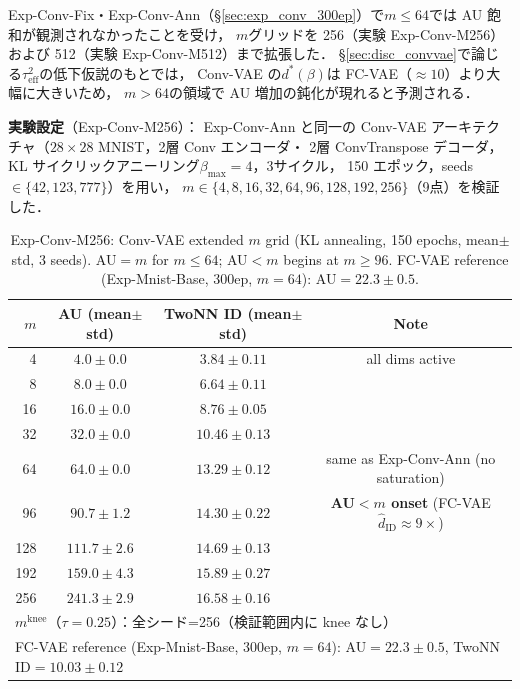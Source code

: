 \documentclass[11pt,a4paper]{jsarticle}
\newcommand{\mknee}{m^{\mathrm{knee}}}
\begin{document}
Exp-Conv-Fix・Exp-Conv-Ann（§\ref{sec:exp_conv_300ep}）で$m \leq 64$では AU 飽和が観測されなかったことを受け，
$m$グリッドを 256（実験 Exp-Conv-M256）および 512（実験 Exp-Conv-M512）まで拡張した．
§\ref{sec:disc_convvae}で論じる$\tau^2_\mathrm{eff}$の低下仮説のもとでは，
Conv-VAE の$d^*(\beta)$は FC-VAE（$\approx 10$）より大幅に大きいため，
$m>64$の領域で AU 増加の鈍化が現れると予測される．

\textbf{実験設定}（Exp-Conv-M256）：
Exp-Conv-Ann と同一の Conv-VAE アーキテクチャ（$28\times28$ MNIST，2層 Conv エンコーダ・
2層 ConvTranspose デコーダ，KL サイクリックアニーリング$\beta_\mathrm{max}=4$，3サイクル，
150 エポック，seeds$\in\{42,123,777\}$）を用い，
$m \in \{4, 8, 16, 32, 64, 96, 128, 192, 256\}$（9点）を検証した．

\begin{table}[H]
\centering
\caption{Exp-Conv-M256: Conv-VAE extended $m$ grid (KL annealing, 150 epochs, mean$\pm$std, 3 seeds). AU$=m$ for $m \leq 64$; AU$<m$ begins at $m \geq 96$. FC-VAE reference (Exp-Mnist-Base, 300ep, $m=64$): AU$=22.3\pm0.5$.}
\label{tab:en}
\small
\begin{tabular}{rccc}
\toprule
$m$ & AU (mean$\pm$std) & TwoNN ID (mean$\pm$std) & Note \\
\midrule
  4 & $4.0\pm0.0$   & $3.84\pm0.11$ & all dims active \\
  8 & $8.0\pm0.0$   & $6.64\pm0.11$ & \\
 16 & $16.0\pm0.0$  & $8.76\pm0.05$ & \\
 32 & $32.0\pm0.0$  & $10.46\pm0.13$ & \\
 64 & $64.0\pm0.0$  & $13.29\pm0.12$ & same as Exp-Conv-Ann (no saturation) \\
 96 & $\mathbf{90.7\pm1.2}$  & $14.30\pm0.22$ & \textbf{AU$<m$ onset} (FC-VAE $\hat{d}_\mathrm{ID} \approx 9\times$) \\
128 & $111.7\pm2.6$ & $14.69\pm0.13$ & \\
192 & $159.0\pm4.3$ & $15.89\pm0.27$ & \\
256 & $241.3\pm2.9$ & $16.58\pm0.16$ & \\
\midrule
\multicolumn{4}{l}{$\mknee$（$\tau=0.25$）：全シード=256（検証範囲内に knee なし）} \\
\multicolumn{4}{l}{FC-VAE reference (Exp-Mnist-Base, 300ep, $m=64$): AU$=22.3\pm0.5$, TwoNN ID$=10.03\pm0.12$} \\
\bottomrule
\end{tabular}
\end{table}
\end{document}
